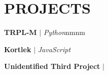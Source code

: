 \section{\textbf {\large PROJECTS}}
\resumeSubHeadingListStart %

    
    \resumeProjectHeading %
    {\textbf{TRPL-M} $|$ \emph{Python}}{nmnm}
    \resumeItemListStart %
        \resumeItem{}
        \resumeItem{}
        \resumeItem{}
    \resumeItemListEnd %

    \resumeProjectHeading %
    {\textbf{Kortlek} $|$ \emph{JavaScript}}{}
    \resumeItemListStart %
        \resumeItem{}
        \resumeItem{}
        \resumeItem{}
    \resumeItemListEnd %

    \resumeProjectHeading %
    {\textbf{Unidentified Third Project} $|$ \emph{}}{}
    \resumeItemListStart %
        \resumeItem{}
        \resumeItem{}
        \resumeItem{}
    \resumeItemListEnd %

\resumeSubHeadingListEnd %